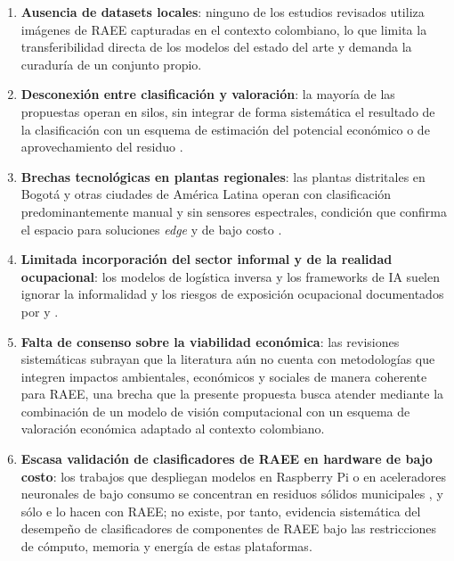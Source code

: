 \begin{enumerate}
    \item \textbf{Ausencia de datasets locales}: ninguno de los estudios revisados utiliza imágenes de RAEE capturadas en el contexto colombiano, lo que limita la transferibilidad directa de los modelos del estado del arte y demanda la curaduría de un conjunto propio.
    \item \textbf{Desconexión entre clasificación y valoración}: la mayoría de las propuestas operan en silos, sin integrar de forma sistemática el resultado de la clasificación con un esquema de estimación del potencial económico o de aprovechamiento del residuo \cite{simaeiAIbasedDecisionSupport2024,anandhMultiobjectiveMetaheuristicsOptimize2024}.
    \item \textbf{Brechas tecnológicas en plantas regionales}: las plantas distritales en Bogotá y otras ciudades de América Latina operan con clasificación predominantemente manual y sin sensores espectrales, condición que confirma el espacio para soluciones \textit{edge} y de bajo costo \cite{a.ceronRecyclableWasteClassification2025a, clinckspoorAnalisisActoresInvolucrados2020}.
    \item \textbf{Limitada incorporación del sector informal y de la realidad ocupacional}: los modelos de logística inversa y los frameworks de IA suelen ignorar la informalidad y los riesgos de exposición ocupacional documentados por \cite{leeseHBM4EUEwasteStudy2025} y \cite{widanapathiranaElectricalElectronicWaste2023}.
    \item \textbf{Falta de consenso sobre la viabilidad económica}: las revisiones sistemáticas \cite{leeEnvironmentalEconomicImpacts2024b, janoClosingLoopSystematic2026} subrayan que la literatura aún no cuenta con metodologías que integren impactos ambientales, económicos y sociales de manera coherente para RAEE, una brecha que la presente propuesta busca atender mediante la combinación de un modelo de visión computacional con un esquema de valoración económica adaptado al contexto colombiano.
    \item \textbf{Escasa validación de clasificadores de RAEE en hardware de bajo costo}: los trabajos que despliegan modelos en Raspberry Pi o en aceleradores neuronales de bajo consumo se concentran en residuos sólidos municipales \cite{castrobelloConvolutionalNeuralNetwork2025,daoDesignImplementationRealTime2026,mutarAIBasedModelHome2026}, y sólo \cite{p.sLowPowerEdgeAI2026} e \cite{ilievEmbeddedSystemEwaste2023} lo hacen con RAEE; no existe, por tanto, evidencia sistemática del desempeño de clasificadores de componentes de RAEE bajo las restricciones de cómputo, memoria y energía de estas plataformas.
\end{enumerate}

